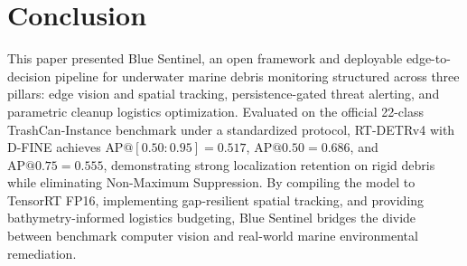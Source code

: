 \documentclass[conference]{IEEEtran}
\begin{document}
\section{Conclusion}
This paper presented Blue Sentinel, an open framework and deployable edge-to-decision pipeline for underwater marine debris monitoring structured across three pillars: edge vision and spatial tracking, persistence-gated threat alerting, and parametric cleanup logistics optimization. Evaluated on the official 22-class TrashCan-Instance benchmark under a standardized protocol, RT-DETRv4 with D-FINE achieves $\text{AP}@[0.50:0.95] = 0.517$, $\text{AP}@0.50 = 0.686$, and $\text{AP}@0.75 = 0.555$, demonstrating strong localization retention on rigid debris while eliminating Non-Maximum Suppression. By compiling the model to TensorRT FP16, implementing gap-resilient spatial tracking, and providing bathymetry-informed logistics budgeting, Blue Sentinel bridges the divide between benchmark computer vision and real-world marine environmental remediation.
\end{document}
